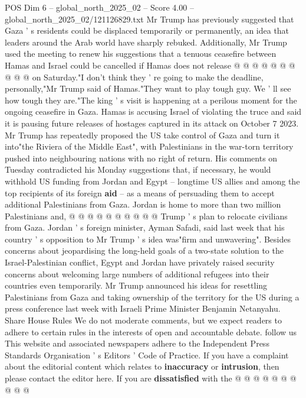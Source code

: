 \begin{textsample}{POS Dim 6 – global\_north\_2025\_02 – Score 4.00 – global\_north\_2025\_02/121126829.txt}
Mr Trump has previously suggested that Gaza ' s residents could be displaced temporarily or permanently, an idea that leaders around the Arab world have sharply rebuked.
Additionally, Mr Trump used the meeting to renew his suggestions that a tenuous ceasefire between Hamas and Israel could be cancelled if Hamas does not release @ @ @ @ @ @ @ @ @ @ on Saturday."I don't think they ' re going to make the deadline, personally,"Mr Trump said of Hamas."They want to play tough guy.
We ' ll see how tough they are."The king ' s visit is happening at a perilous moment for the ongoing ceasefire in Gaza.
Hamas is accusing Israel of violating the truce and said it is pausing future releases of hostages captured in its attack on October 7 2023.
Mr Trump has repeatedly proposed the US take control of Gaza and turn it into"the Riviera of the Middle East", with Palestinians in the war-torn territory pushed into neighbouring nations with no right of return.
His comments on Tuesday contradicted his Monday suggestions that, if necessary, he would withhold US funding from Jordan and Egypt -- longtime US allies and among the top recipients of its foreign \textbf{aid} -- as a means of persuading them to accept additional Palestinians from Gaza.
Jordan is home to more than two million Palestinians and, @ @ @ @ @ @ @ @ @ @ Trump ' s plan to relocate civilians from Gaza.
Jordan ' s foreign minister, Ayman Safadi, said last week that his country ' s opposition to Mr Trump ' s idea was"firm and unwavering".
Besides concerns about jeopardising the long-held goals of a two-state solution to the Israel-Palestinian conflict, Egypt and Jordan have privately raised security concerns about welcoming large numbers of additional refugees into their countries even temporarily.
Mr Trump announced his ideas for resettling Palestinians from Gaza and taking ownership of the territory for the US during a press conference last week with Israeli Prime Minister Benjamin Netanyahu.
Share House Rules We do not moderate comments, but we expect readers to adhere to certain rules in the interests of open and accountable debate. follow us This website and associated newspapers adhere to the Independent Press Standards Organisation ' s Editors ' Code of Practice.
If you have a complaint about the editorial content which relates to \textbf{inaccuracy} or \textbf{intrusion}, then please contact the editor here.
If you are \textbf{dissatisfied} with the @ @ @ @ @ @ @ @ @ @

\end{textsample}
